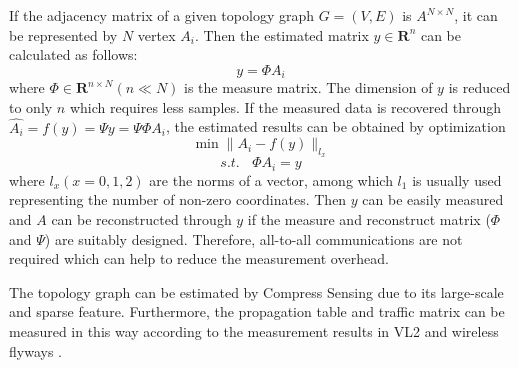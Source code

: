 \documentclass[journal,onecolumn,11pt]{IEEEtran}
\begin{document}
If the adjacency matrix of a given topology graph $G=(V,E)$ is $A^{N\times N}$, it can be represented by $N$ vertex $A_i$. Then the estimated matrix $y\in \textbf{R}^n$ can be calculated as follows:
\begin{equation}
 y=\Phi A_i
 \label{estimation}
\end{equation}
where $\Phi\in \textbf{R}^{n\times N} (n\ll N)$ is the measure matrix. The dimension of $y$ is reduced to only $n$ which requires less samples. If the measured data is recovered through $\hat{A_i}=f(y)=\Psi y=\Psi\Phi A_i$, the estimated results can be obtained by optimization
\begin{equation}
\min \parallel A_i-f(y) \parallel_{l_x}
 \label{recover1}
\end{equation}
\begin{equation}
 s.t.~~~~\Phi A_i = y
 \label{recover2}
\end{equation}
where $l_x (x=0,1,2)$ are the norms of a vector, among which $l_1$ is usually used representing the number of non-zero coordinates. Then $y$ can be easily measured and $A$ can be reconstructed through $y$ if the measure and reconstruct matrix ($\Phi$ and $\Psi$) are suitably designed. Therefore, all-to-all communications are not required which can help to reduce the measurement overhead.

The topology graph can be estimated by Compress Sensing due to its large-scale and sparse feature. Furthermore, the propagation table and traffic matrix can be measured in this way according to the measurement results in VL2 \cite{Greenberg:2009:VSF:1592568.1592576} and wireless flyways \cite{Halperin:2011:ADC:2018436.2018442}.

%
\end{document}
